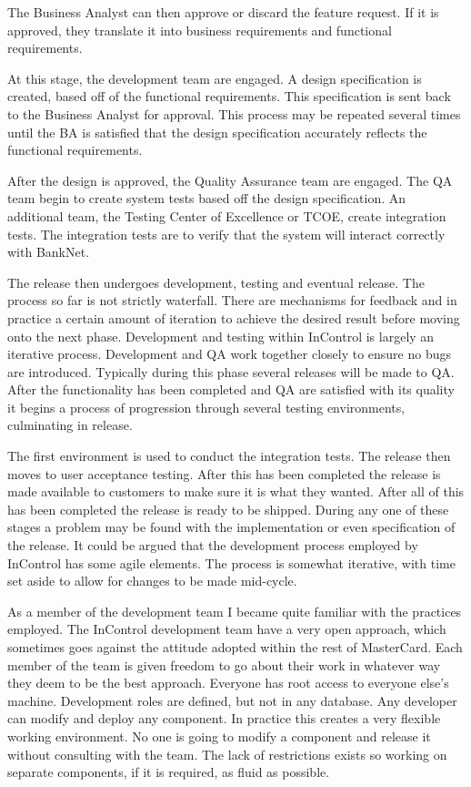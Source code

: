 \documentclass[a4paper, 11pt, titlepage]{article}
\begin{document}
The Business Analyst can then approve or discard the feature request. If it is approved, they translate it into business requirements and functional requirements.

At this stage, the development team are engaged. A design specification is created, based off of the functional requirements. This specification is sent back to the Business Analyst for approval. This process may be repeated several times until the BA is satisfied that the design specification accurately reflects the functional requirements.

After the design is approved, the Quality Assurance team are engaged. The QA team begin to create system tests based off the design specification. An additional team, the Testing Center of Excellence or TCOE, create integration tests. The integration tests are to verify that the system will interact correctly with BankNet.

The release then undergoes development, testing and eventual release. The process so far is not strictly waterfall. There are mechanisms for feedback and in practice a certain amount of iteration to achieve the desired result before moving onto the next phase. Development and testing within InControl is largely an iterative process. Development and QA work together closely to ensure no bugs are introduced. Typically during this phase several releases will be made to QA. After the functionality has been completed and QA are satisfied with its quality it begins a process of progression through several testing environments, culminating in release.

The first environment is used to conduct the integration tests. The release then moves to user acceptance testing. After this has been completed the release is made available to customers to make sure it is what they wanted. After all of this has been completed the release is ready to be shipped. During any one of these stages a problem may be found with the implementation or even specification of the release. It could be argued that the development process employed by InControl has some agile elements. The process is somewhat iterative, with time set aside to allow for changes to be made mid-cycle.

\label{dev}
As a member of the development team I became quite familiar with the practices employed. The InControl development team have a very open approach, which sometimes goes against the attitude adopted within the rest of MasterCard. Each member of the team is given freedom to go about their work in whatever way they deem to be the best approach. Everyone has root access to everyone else's machine. Development roles are defined, but not in any database. Any developer can modify and deploy any component. In practice this creates a very flexible working environment. No one is going to modify a component and release it without consulting with the team. The lack of restrictions exists so working on separate components, if it is required, as fluid as possible. 
\end{document}
